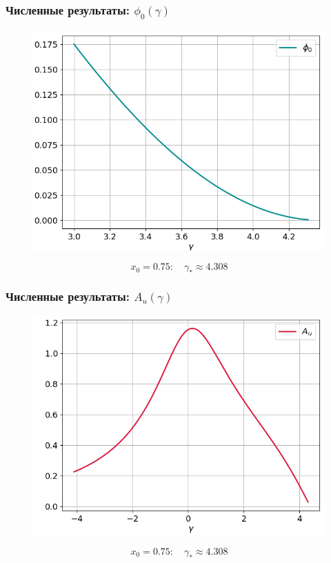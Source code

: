 \documentclass[fullscreen=true, unicode, bookmarks=false]{beamer}
\begin{document}
\begin{frame}
\frametitle{ Численные результаты: $ \phi_0(\gamma) $ }

\begin{figure} 
\includegraphics[scale=0.55]{divergent_phi0_34.png}  
\end{figure}

$$ x_0 = 0.75: \quad \gamma_* \approx 4.308 $$

\end{frame}

\begin{frame}
\frametitle{ Численные результаты: $ A_u(\gamma) $ }

\begin{figure} 
\includegraphics[scale=0.55]{divergent_amplitude_34.png}  
\end{figure}

$$ x_0 = 0.75: \quad \gamma_* \approx 4.308 $$

\end{frame}
\end{document}
